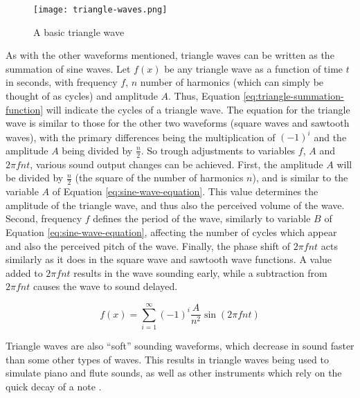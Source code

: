 \begin{figure}[ht]
  \centering
  \texttt{[image: triangle-waves.png]}
  \caption{A basic triangle wave}\cite{Wellesley_College_Staff_2021}
  \label{fig:triangle-wave}
\end{figure}

As with the other waveforms mentioned, triangle waves can be written as the summation of sine waves. Let $f(x)$ be any triangle wave as a function of time $t$ in seconds, with frequency $f$, $n$ number of harmonics (which can simply be thought of as cycles) and amplitude $A$. Thus, Equation \ref{eq:triangle-summation-function} will indicate the cycles of a triangle wave. The equation for the triangle wave is similar to those for the other two waveforms (square waves and sawtooth waves), with the primary differences being the multiplication of $(-1)^i$ and the amplitude $A$ being divided by $\frac{n}{2}$. So trough adjustments to variables $f$, $A$ and $2\pi fnt$, various sound output changes can be achieved. First, the amplitude $A$ will be divided by $\frac{n}{2}$ (the square of the number of harmonics $n$), and is similar to the variable $A$ of Equation \ref{eq:sine-wave-equation}. This value determines the amplitude of the triangle wave, and thus also the perceived volume of the wave. Second, frequency $f$ defines the period of the wave, similarly to variable $B$ of Equation \ref{eq:sine-wave-equation}, affecting the number of cycles which appear and also the perceived pitch of the wave. Finally, the phase shift of $2\pi fnt$ acts similarly as it does in the square wave and sawtooth wave functions. A value added to $2\pi fnt$ results in the wave sounding early, while a subtraction from $2\pi fnt$ causes the wave to sound delayed. 


\begin{equation}
	f(x) = \sum_{i=1}^{\infty} (-1)^i \frac{A}{n^2} \sin(2\pi fnt)
	\label{eq:triangle-summation-function}
\end{equation}

Triangle waves are also ``soft'' sounding waveforms, which decrease in sound faster than some other types of waves. This results in triangle waves being used to simulate piano and flute sounds, as well as other instruments which rely on the quick decay of a note \cite{Dowsett_2016}.


